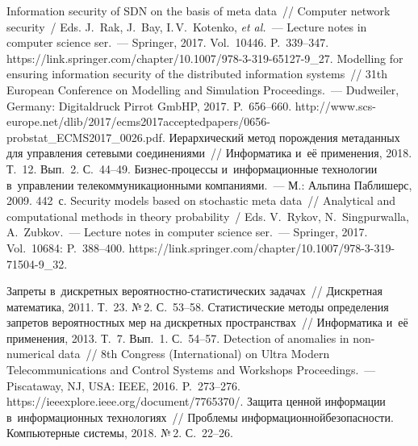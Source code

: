 \begin{multicols}{2}
{\small\frenchspacing
 {%
 \begin{thebibliography}{9}
 Information security of 
SDN on the basis of meta data~// Computer network security~/ Eds. J.~Rak, J.~Bay, I.\,V.~Kotenko, 
\textit{et al.}~--- Lecture notes in computer science ser.~--- Springer, 2017. Vol.~10446. P.~339--347. 
{\sf https://link.springer.com/chapter/10.1007/978-3-319-65127-9\_27}.
 Modelling for ensuring information security of 
the distributed information systems~// 31th European Conference on Modelling and Simulation 
Proceedings.~--- Dudweiler, Germany: Digitaldruck Pirrot GmbHP, 2017. P.~656--660. 
{\sf  
http://www.scs-europe.net/dlib/2017/ecms2017acceptedpapers/0656-probstat\_ECMS2017\_0026.pdf}.
 Иерархический метод порождения 
метаданных для управления сетевыми соединениями~// Информатика и~её применения, 2018. 
Т.~12. Вып.~2. С.~44--49.
 Биз\-нес-про\-цес\-сы и~информационные 
технологии в~управлении телекоммуникационными компаниями.~--- М.: Альпина Паблишерс, 
2009. 442~с. 
 Security models based on stochastic meta data~// Analytical 
and computational methods in theory probability~/ Eds. V.~Rykov, N.~Singpurwalla, A.~Zubkov.~---
Lecture notes in computer science ser.~--- Springer, 2017. Vol.~10684: P.~388--400.
{\sf https://link.springer.com/chapter/10.1007/978-3-319-71504-9\_32}. 

Запреты в~дискретных ве\-ро\-ят\-но\-ст\-но-ста\-ти\-сти\-че\-ских задачах~// 
Дискретная математика, 2011. Т.~23. №\,2. С.~53--58.
 Статистические методы определения запретов 
вероятностных мер на дискретных пространствах~// Информатика и~её применения, 2013. Т.~7. 
Вып.~1. С.~54--57.
 Detection of anomalies in non-numerical data~// 8th 
Congress (International) on Ultra Modern Telecommunications and Control Systems and Workshops 
Proceedings.~--- Piscataway, NJ, USA: IEEE, 2016. P.~273--276.
{\sf https://ieeexplore.\linebreak ieee.org/document/7765370/}.
 Защита ценной 
информации в~информационных технологиях~// Проблемы информационной\linebreak без\-опас\-ности. 
Компьютерные системы, 2018. №\,2. С.~22--26.

 \end{thebibliography}

 }
 }

\end{multicols}

